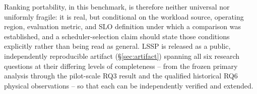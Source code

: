 Ranking portability, in this benchmark, is therefore neither universal nor
uniformly fragile: it is real, but conditional on the workload source,
operating region, evaluation metric, and SLO definition under which a
comparison was established, and a scheduler-selection claim should state
those conditions explicitly rather than being read as general. LSSP is
released as a public, independently reproducible artifact
(\S\ref{sec:artifact}) spanning all six research questions at their
differing levels of completeness -- from the frozen primary analysis
through the pilot-scale RQ3 result and the qualified historical RQ6
physical observations -- so that each can be independently verified and extended.

